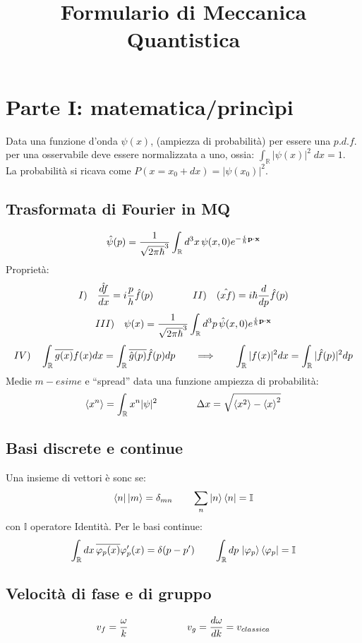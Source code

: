 


\title{Formulario di Meccanica Quantistica}
\author{}

\maketitle



\section{Parte I: matematica/princìpi}
Data una funzione d'onda $\psi(x)$, (ampiezza di probabilità) per essere una $p.d.f.$ per una osservabile deve essere normalizzata a uno,
ossia: $ \int_\mathbb{R} | \psi(x) |^2\; dx = 1 $. \\
La probabilità si ricava come $ P(x=x_0 + dx)= | \psi(x_0) |^2 $. \\
\subsection{Trasformata di Fourier in MQ}
$$
\hat{\psi}(p)= \frac{1}{\sqrt{2 \pi \hbar}^3} \int_\mathbb{R} d^3 x \, \psi(x,0) e^{-\frac{i}{\hbar} \mathbf{p}\cdot {\ensuremath{\mathbf{x}}}}$$ 
Proprietà:
$$
 I) \quad \hat{\frac{d f}{d x}} = i \frac{p}{h} \hat{f}(p)  \qquad \qquad II) \quad \hat{(xf)} = i \hbar \frac{d }{d p}\hat{f}(p)
$$
$$
III) \quad \psi(x)= \frac{1}{\sqrt{2 \pi \hbar}^3} \int_\mathbb{R} d^3 p \, \hat{\psi}(x,0) e^{\frac{i}{\hbar} \mathbf{p}\cdot {\ensuremath{\mathbf{x}}}}$$ 
$$
    IV) \quad \int_\mathbb{R} \overline{g(x)} f(x) dx =  \int_\mathbb{R} \overline{\hat{g}(p)}  \hat{f}(p) dp \qquad \Longrightarrow \qquad \int_\mathbb{R} |f(x)|^2 dx = \int_\mathbb{R} |\hat{f}(p)|^2 dp
$$
Medie $m-esime$ e ``spread'' data una funzione ampiezza di probabilità:
$$ \left< x ^{n} \right> = \int_\mathbb{R} x^n | \psi|^2 \qquad \qquad \Delta x = \sqrt{ \left< x ^{2} \right> - \left< x \right>^2}
$$ 
\subsection{Basi discrete e continue}
Una insieme di vettori è sonc se:
$$ 
 \left< n \right|\left| m \right> = \delta_{mn} \qquad \sum_n \left| n \right>\left< n \right| = \mathbb{I}
$$
con $\mathbb{I} $ operatore Identità.
Per le basi continue:
$$
\int_\mathbb{R} dx \, \overline{\varphi_p (x)} \varphi_p' (x)  = \delta(p-p') \qquad 
\int_\mathbb{R} dp \, \left| \varphi_p \right> \left< \varphi_p \right|  = \mathbb{I} 
$$

\subsection{Velocità di fase e di gruppo}
$$
v_f = \frac{\omega}{k} \qquad \qquad \qquad v_g= \frac{d \omega}{d k} = v_{classica}
$$
